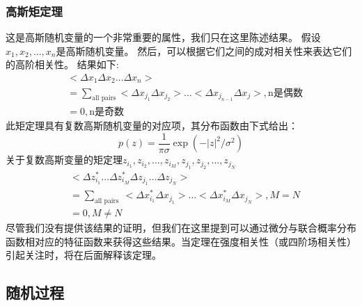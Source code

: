 \documentclass[12pt, UTF8]{ctexart}%
\numberwithin{equation}{section}
\numberwithin{figure}{section}
\newcommand{\InsertEqution}[2]{\begin{equation}
  \label{#1}
   #2
 \end{equation}}
\newcommand{\InsertInlineEq}[1]{$#1$}
\begin{document}
\begin{sloppypar}
\subsubsection{高斯矩定理}
这是高斯随机变量的一个非常重要的属性，我们只在这里陈述结果。 假设\InsertInlineEq{x_1,x_2,...,x_n}是高斯随机变量。 然后，可以根据它们之间的成对相关性来表达它们的高阶相关性。 结果如下:
\InsertEqution{7.37}{\begin{aligned}
  &<\Delta x_{1} \Delta x_{2} \ldots \Delta x_{n}>\\
  &=\sum_{\text{all pairs}}<\Delta x_{j_{1}} \Delta x_{j_{2}}>\ldots<\Delta x_{j_{n-1}} \Delta x_{j}> ,\text{n是偶数}\\
  &=0,\text{n是奇数}
  \end{aligned}}
此矩定理具有复数高斯随机变量的对应项，其分布函数由下式给出：
\InsertEqution{7.38}{p(z)=\frac{1}{\pi \sigma} \exp \left(-|z|^{2} / \sigma^{2}\right)}
关于复数高斯变量的矩定理\InsertInlineEq{z_{i_{1}}, z_{i_{2}}, \ldots, z_{i_{M}}, z_{j_{1}}, z_{j_{2}}, \ldots, z_{j_{N}}}
\InsertEqution{7.39}{\begin{aligned}
  &<\Delta z_{i_{1}}^{*} \ldots \Delta z_{i_{M}}^{*} \Delta z_{j_{1}} \ldots \Delta z_{j_{N}}> \\
  &=\sum_{\text {all pairs }}<\Delta x_{i_{1}}^{*} \Delta x_{j_{1}}>\ldots<\Delta x_{i_{M}}^{*} \Delta x_{j_{N}}>,M=N \\
  &=0 , M \neq N
  \end{aligned}}
  尽管我们没有提供该结果的证明，但我们在这里提到可以通过微分与联合概率分布函数相对应的特征函数来获得这些结果。当定理在强度相关性（或四阶场相关性）引起关注时，将在后面解释该定理。
\subsection{随机过程}
  \end{sloppypar}
\end{document}
